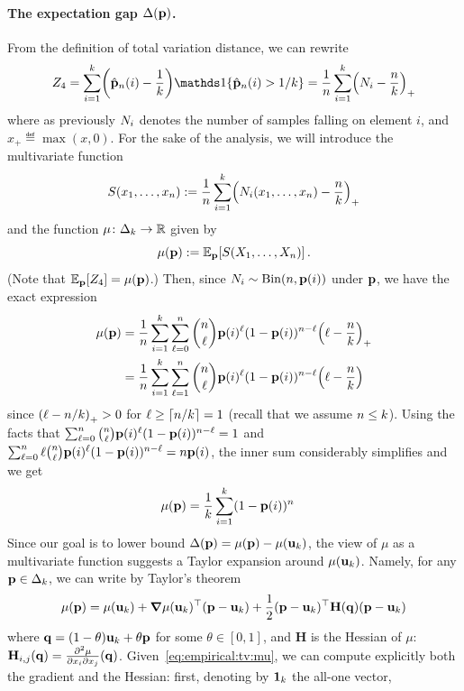 \paragraph{The expectation gap $\Delta(\mathbf{p})$.} From the definition of total variation distance, we can rewrite
\[
    Z_4 = \sum_{i=1}^\ab \Paren{\hat{\p}_\ns(i) - \frac{1}{\ab}}\indic{\hat{\p}_\ns(i) > 1/\ab}
    = \frac{1}{\ns} \sum_{i=1}^\ab \Paren{\occur_i - \frac{\ns}{\ab} }_+
\]
where as previously $N_i$ denotes the number of samples falling on element $i$, and $x_+ \eqdef \max(x,0)$. For the sake of the analysis, we will introduce the multivariate function
\begin{equation}
  \label{eq:empirical:S}
  S(x_1,\dots,x_\ns) \eqdef \frac{1}{\ns} \sum_{i=1}^\ab \Paren{\occur_i(x_1,\dots,x_\ns) - \frac{\ns}{\ab} }_+
\end{equation}
and the function $\mu\colon\Delta_{k}\to \mathbb{R}$ given by
\[
 \mu(\p) \eqdef \bE{\p}{S(X_1,\dots,X_\ns)}\,.
\] 
(Note that $\bE{\p}{Z_4} = \mu(\p)$.) Then, since $\occur_i\sim\binomial{\ns}{\p(i)}$ under $\mathbf{p}$, we have the exact expression
\begin{align*}
 \mu(\p) 
    &= \frac{1}{\ns} \sum_{i=1}^\ab \sum_{\ell=0}^\ns \binom{\ns}{\ell} \p(i)^\ell (1-\p(i))^{\ns-\ell} \Paren{\ell - \frac{\ns}{\ab} }_+ \\
    &= \frac{1}{\ns} \sum_{i=1}^\ab \sum_{\ell=1}^\ns \binom{\ns}{\ell} \p(i)^\ell (1-\p(i))^{\ns-\ell} \Paren{\ell - \frac{\ns}{\ab} }
\end{align*}
since $\Paren{\ell - \ns/\ab }_+ > 0$ for $\ell \geq \clg{\ns/\ab}=1$ (recall that we assume $n \leq k$). Using the facts that
$
    \sum_{\ell=0}^n \binom{n}{\ell} \mathbf{p}(i)^\ell (1-\mathbf{p}(i))^{n-\ell} = 1
$
and
$
    \sum_{\ell=0}^n \ell \binom{n}{\ell} \mathbf{p}(i)^\ell (1-\mathbf{p}(i))^{n-\ell} = n\mathbf{p}(i)
$, the inner sum considerably simplifies and we get
\begin{align}
  \label{eq:empirical:tv:mu}
 \mu(\mathbf{p}) 
    &= \frac{1}{k} \sum_{i=1}^k (1-\mathbf{p}(i))^{n}
\end{align}
Since our goal is to lower bound $\Delta(\mathbf{p}) = \mu(\mathbf{p}) - \mu(\mathbf{u}_k)$, the view of $\mu$ as a multivariate function suggests a Taylor expansion around $\mu(\mathbf{u}_k)$. Namely, for any $\mathbf{p}\in\Delta_{k}$, we can write by Taylor's theorem
\[
    \mu(\mathbf{p}) = \mu(\mathbf{u}_k) + \grad{\mu(\ensuremath{\mathbf{u}}_k)}^\top (\mathbf{p}-\mathbf{u}_k) + \frac{1}{2} (\mathbf{p}-\mathbf{u}_k)^\top \mathbf{H}(\mathbf{q}) (\mathbf{p}-\mathbf{u}_k)
\]
where $\mathbf{q} = (1-\theta)\mathbf{u}_k+\theta\mathbf{p}$ for some $\theta\in[0,1]$, and $\mathbf{H}$ is the Hessian of $\mu$: $\mathbf{H}_{i,j}(\mathbf{q}) = \pdv{\mu}{x_i}{x_j}\-(\mathbf{q})$.  Given~\cref{eq:empirical:tv:mu}, we can compute explicitly both the gradient and the Hessian: first, denoting by $\mathbf{1}_{k}$ the all-one vector,
